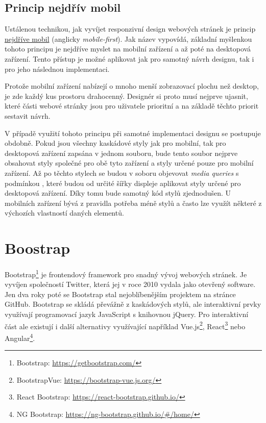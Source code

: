 \subsection{Princip nejdřív mobil}\label{section:mobile-first}
Ustálenou technikou, jak vyvíjet responzivní design webových stránek je princip \ul{nejdříve mobil} (anglicky \emph{mobile-first}). Jak název vypovídá, základní myšlenkou tohoto principu je nejdříve myslet na mobilní zařízení a až poté na desktopová zařízení. Tento přístup je možné aplikovat jak pro samotný návrh designu, tak i pro jeho následnou implementaci.

Protože mobilní zařízení nabízejí o mnoho menší zobrazovací plochu než desktop, je zde každý kus prostoru drahocenný. Designér si proto musí nejprve ujasnit, které části webové stránky jsou pro uživatele prioritní a na základě těchto priorit sestavit návrh.

V případě využití tohoto principu při samotné implementaci designu se postupuje obdobně. Pokud jsou všechny kaskádové styly jak pro mobilní, tak pro desktopová zařízení zapsána v jednom souboru, bude tento soubor nejprve obsahovat styly společné pro obě tyto zařízení a styly určené pouze pro mobilní zařízení. Až po těchto stylech se budou v soboru objevovat \emph{media queries} s podmínkou , které budou od určité šířky displeje aplikovat styly určené pro desktopová zařízení. Díky tomu bude samotný kód stylů zjednodušen. U mobilních zařízení bývá z pravidla potřeba méně stylů a často lze využít některé z výchozích vlastností daných elementů.


\section{Boostrap}
Bootstrap\footnote{Bootstrap: \url{https://getbootstrap.com/}} je frontendový framework pro snadný vývoj webových stránek. Je vyvíjen společností Twitter, která jej v roce 2010 vydala jako otevřený software. Jen dva roky poté se Bootstrap stal nejoblíbenějším projektem na stránce GitHub. Bootstrap se skládá převážně z kaskádových stylů, ale interaktivní prvky využívají programovací jazyk JavaScript s knihovnou jQuery. Pro interaktivní část ale existují i další alternativy využívající například Vue.js\footnote{BootstrapVue: \url{https://bootstrap-vue.js.org/}}, React\footnote{React Bootstrap: \url{https://react-bootstrap.github.io/}} nebo Angular\footnote{NG Bootstrap: \url{https://ng-bootstrap.github.io/#/home/}}.

